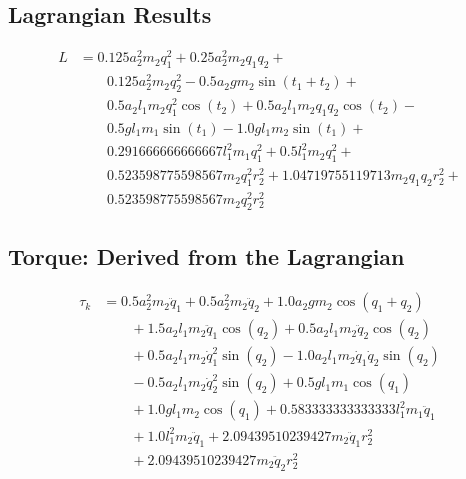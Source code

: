 \documentclass[10pt]{article}
\begin{document}
\subsection{Lagrangian Results}
\begin{equation}
\begin{align}
L  &=  0.125 a_{2}^{2} m_{2} q_{1}^{2} + 0.25 a_{2}^{2} m_{2} q_{1} q_{2} + \nonumber\\
&\qquad 0.125 a_{2}^{2} m_{2} q_{2}^{2}  - 0.5 a_{2} g m_{2} \sin{\left (t_{1} + t_{2} \right )} + \nonumber\\
&\qquad 0.5 a_{2} l_{1} m_{2} q_{1}^{2} \cos{\left (t_{2} \right )}  +  0.5 a_{2} l_{1} m_{2} q_{1} q_{2} \cos{\left (t_{2} \right )} - \nonumber\\
&\qquad 0.5 g l_{1} m_{1} \sin{\left (t_{1} \right )} -  1.0 g l_{1} m_{2} \sin{\left (t_{1} \right )} + \nonumber\\
&\qquad 0.291666666666667 l_{1}^{2} m_{1} q_{1}^{2} + 0.5 l_{1}^{2} m_{2} q_{1}^{2} + \nonumber\\
&\qquad 0.523598775598567 m_{2} q_{1}^{2} r_{2}^{2} + 1.04719755119713 m_{2} q_{1} q_{2} r_{2}^{2} + \nonumber\\
&\qquad 0.523598775598567 m_{2} q_{2}^{2} r_{2}^{2}
\end{align}
\end{equation}

\subsection{Torque: Derived from the Lagrangian}
\begin{equation}
\begin{align}
\tau_{k} &= 0.5 a_{2}^{2} m_{2} \ddot{q}_{1} + 0.5 a_{2}^{2} m_{2} \ddot{q}_{2} + 1.0 a_{2} g m_{2} \cos{\left (q_{1} + q_{2} \right )} \nonumber\\
&\qquad + 1.5 a_{2} l_{1} m_{2} \ddot{q}_{1} \cos{\left (q_{2} \right )} + 0.5 a_{2} l_{1} m_{2} \ddot{q}_{2} \cos{\left (q_{2} \right )}\nonumber\\
&\qquad + 0.5 a_{2} l_{1} m_{2} \dot{q}_{1}^{2} \sin{\left (q_{2} \right )} - 1.0 a_{2} l_{1} m_{2} \dot{q}_{1} \dot{q}_{2} \sin{\left (q_{2} \right )}\nonumber\\
&\qquad - 0.5 a_{2} l_{1} m_{2} \dot{q}_{2}^{2} \sin{\left (q_{2} \right )} + 0.5 g l_{1} m_{1} \cos{\left (q_{1} \right )} \nonumber\\
&\qquad + 1.0 g l_{1} m_{2} \cos{\left (q_{1} \right )} + 0.583333333333333 l_{1}^{2} m_{1} \ddot{q}_{1}\nonumber\\
&\qquad + 1.0 l_{1}^{2} m_{2} \ddot{q}_{1} + 2.09439510239427 m_{2} \ddot{q}_{1} r_{2}^{2} \nonumber\\
&\qquad + 2.09439510239427 m_{2} \ddot{q}_{2} r_{2}^{2}
\end{align}
\end{equation}
\end{document}
